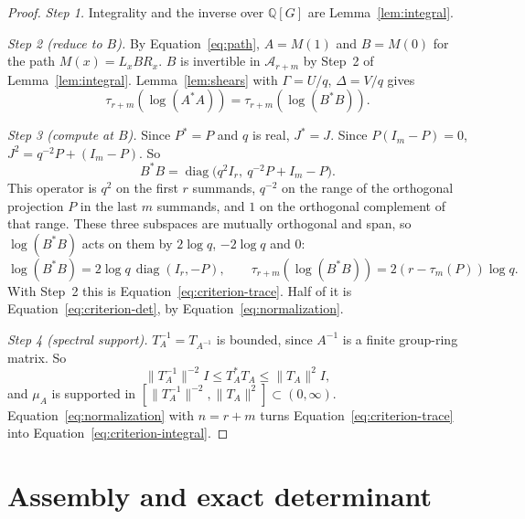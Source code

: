 \documentclass[11pt]{article}
\theoremstyle{remark}
\numberwithin{equation}{section}
\newcommand{\Q}{\mathbb Q}
\newcommand{\diag}{\operatorname{diag}}
\begin{document}
\begin{proof}
\emph{Step 1.} Integrality and the inverse over $\Q[G]$ are Lemma~\ref{lem:integral}.

\emph{Step 2 (reduce to $B$).} By Equation~\eqref{eq:path}, $A=M(1)$ and $B=M(0)$ for the path $M(x)=L_xBR_x$. $B$ is invertible in $\mathcal A_{r+m}$ by Step~2 of Lemma~\ref{lem:integral}. Lemma~\ref{lem:shears} with $\Gamma=U/q$, $\Delta=V/q$ gives
\[
 \tau_{r+m}(\log(A^*A))=\tau_{r+m}(\log(B^*B)).
\]

\emph{Step 3 (compute at $B$).} Since $P^*=P$ and $q$ is real, $J^*=J$. Since $P(I_m-P)=0$, $J^2=q^{-2}P+(I_m-P)$. So
\[
 B^*B=\diag\bigl(q^2I_r,\ q^{-2}P+I_m-P\bigr).
\]
This operator is $q^2$ on the first $r$ summands, $q^{-2}$ on the range of the orthogonal projection $P$ in the last $m$ summands, and $1$ on the orthogonal complement of that range. These three subspaces are mutually orthogonal and span, so $\log(B^*B)$ acts on them by $2\log q$, $-2\log q$ and $0$:
\[
 \log(B^*B)=2\log q\,\diag(I_r,-P),\qquad
 \tau_{r+m}(\log(B^*B))=2(r-\tau_m(P))\log q.
\]
With Step~2 this is Equation~\eqref{eq:criterion-trace}. Half of it is Equation~\eqref{eq:criterion-det}, by Equation~\eqref{eq:normalization}.

\emph{Step 4 (spectral support).} $T_A^{-1}=T_{A^{-1}}$ is bounded, since $A^{-1}$ is a finite group-ring matrix. So
\[
 \|T_A^{-1}\|^{-2}I\le T_A^*T_A\le\|T_A\|^2I,
\]
and $\mu_A$ is supported in $[\|T_A^{-1}\|^{-2},\|T_A\|^2]\subset(0,\infty)$. Equation~\eqref{eq:normalization} with $n=r+m$ turns Equation~\eqref{eq:criterion-trace} into Equation~\eqref{eq:criterion-integral}.
\end{proof}

\section{Assembly and exact determinant}
\label{sec:assembly}
\end{document}

